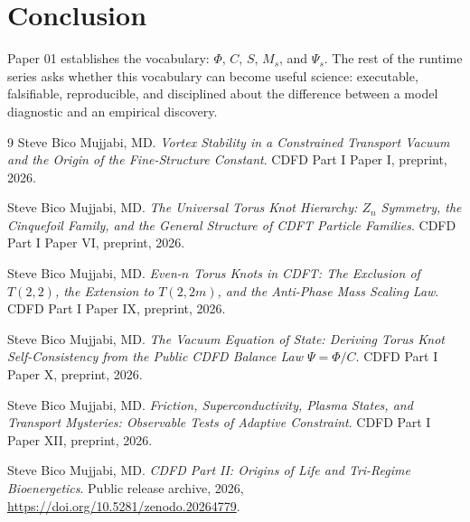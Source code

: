 \documentclass[12pt,a4paper]{article}
\begin{document}
\section{Conclusion}
Paper 01 establishes the vocabulary: $\Phi$, $C$, $S$, $M_s$, and $\Psi_s$.
The rest of the runtime series asks whether this vocabulary can become useful
science: executable, falsifiable, reproducible, and disciplined about the
difference between a model diagnostic and an empirical discovery.
\begin{thebibliography}{9}
Steve Bico Mujjabi, MD. \emph{Vortex Stability in a Constrained Transport Vacuum and the Origin of the Fine-Structure Constant}. CDFD Part I Paper I, preprint, 2026.

Steve Bico Mujjabi, MD. \emph{The Universal Torus Knot Hierarchy: $Z_n$ Symmetry, the Cinquefoil Family, and the General Structure of CDFT Particle Families}. CDFD Part I Paper VI, preprint, 2026.

Steve Bico Mujjabi, MD. \emph{Even-$n$ Torus Knots in CDFT: The Exclusion of $T(2,2)$, the Extension to $T(2,2m)$, and the Anti-Phase Mass Scaling Law}. CDFD Part I Paper IX, preprint, 2026.

Steve Bico Mujjabi, MD. \emph{The Vacuum Equation of State: Deriving Torus Knot Self-Consistency from the Public CDFD Balance Law $\Psi = \Phi/C$}. CDFD Part I Paper X, preprint, 2026.

Steve Bico Mujjabi, MD. \emph{Friction, Superconductivity, Plasma States, and Transport Mysteries: Observable Tests of Adaptive Constraint}. CDFD Part I Paper XII, preprint, 2026.

Steve Bico Mujjabi, MD. \emph{CDFD Part II: Origins of Life and Tri-Regime Bioenergetics}. Public release archive, 2026, \url{https://doi.org/10.5281/zenodo.20264779}.
\end{thebibliography}
\end{document}

